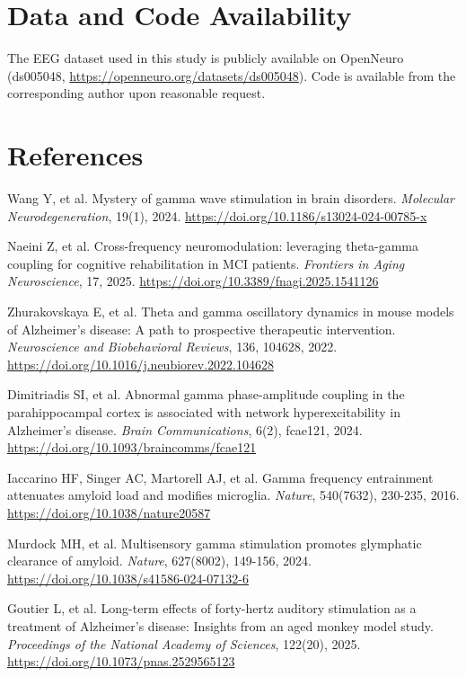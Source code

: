 \documentclass[11pt,letterpaper]{article}
\begin{document}
\section*{Data and Code Availability}

The EEG dataset used in this study is publicly available on OpenNeuro (ds005048, \url{https://openneuro.org/datasets/ds005048}). Code is available from the corresponding author upon reasonable request.

\section*{References}
\begin{enumerate}[label={[\arabic*]}, leftmargin=2em, itemsep=2pt, parsep=0pt]
\item Wang Y, et al. Mystery of gamma wave stimulation in brain disorders. \textit{Molecular Neurodegeneration}, 19(1), 2024. \url{https://doi.org/10.1186/s13024-024-00785-x}
\item Naeini Z, et al. Cross-frequency neuromodulation: leveraging theta-gamma coupling for cognitive rehabilitation in MCI patients. \textit{Frontiers in Aging Neuroscience}, 17, 2025. \url{https://doi.org/10.3389/fnagi.2025.1541126}
\item Zhurakovskaya E, et al. Theta and gamma oscillatory dynamics in mouse models of Alzheimer's disease: A path to prospective therapeutic intervention. \textit{Neuroscience and Biobehavioral Reviews}, 136, 104628, 2022. \url{https://doi.org/10.1016/j.neubiorev.2022.104628}
\item Dimitriadis SI, et al. Abnormal gamma phase-amplitude coupling in the parahippocampal cortex is associated with network hyperexcitability in Alzheimer's disease. \textit{Brain Communications}, 6(2), fcae121, 2024. \url{https://doi.org/10.1093/braincomms/fcae121}
\item Iaccarino HF, Singer AC, Martorell AJ, et al. Gamma frequency entrainment attenuates amyloid load and modifies microglia. \textit{Nature}, 540(7632), 230-235, 2016. \url{https://doi.org/10.1038/nature20587}
\item Murdock MH, et al. Multisensory gamma stimulation promotes glymphatic clearance of amyloid. \textit{Nature}, 627(8002), 149-156, 2024. \url{https://doi.org/10.1038/s41586-024-07132-6}
\item Goutier L, et al. Long-term effects of forty-hertz auditory stimulation as a treatment of Alzheimer's disease: Insights from an aged monkey model study. \textit{Proceedings of the National Academy of Sciences}, 122(20), 2025. \url{https://doi.org/10.1073/pnas.2529565123}

\end{enumerate}
\end{document}
